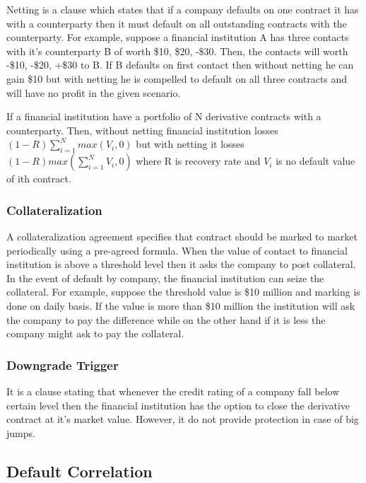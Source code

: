 \documentclass[11pt]{article}
\numberwithin{equation}{section}
\begin{document}
Netting is a clause which states that if a company defaults on one contract it has with a counterparty then it must default on all outstanding contracts with the counterparty. For example, suppose a financial institution A has three contacts with it's counterparty B of worth \$10, \$20, -\$30. Then, the contacts will worth  -\$10, -\$20, +\$30 to B. If B defaults on first contact then without netting he can gain \$10 but with netting he is compelled to default on all three contracts and will have no profit in the given scenario.\medskip

  \hspace{1cm} If a financial institution have a portfolio of N derivative contracts with a counterparty. Then, without netting financial institution losses $(1-R)\sum_{i=1}^N max(V_i,0) $ but with netting it losses $(1-R) max(\sum_{i=1}^N V_i,0)$ where R is recovery rate and $V_i$ is no default value of ith contract.
  
  \subsubsection{Collateralization}
  \medskip

   A collateralization agreement specifies that contract should be marked to market periodically using a pre-agreed formula. When the value of contact to financial institution is above a threshold level then it asks the company to post collateral. In the event of default by company, the financial institution can seize the collateral. For example, suppose the threshold value is \$10 million and marking is done on daily basis. If the value is more than \$10 million the institution will ask the company to pay the difference while on the other hand if it is less the company might ask to pay the collateral.
   
   \subsubsection{Downgrade Trigger}
   \medskip
   
   It is a clause stating that whenever the credit rating of a company fall below certain level then the financial institution has the option to close the derivative contract at it's market value. However, it do not provide protection in case of big jumps.     
   
   \subsection{Default Correlation}
   \medskip
   
\end{document}
